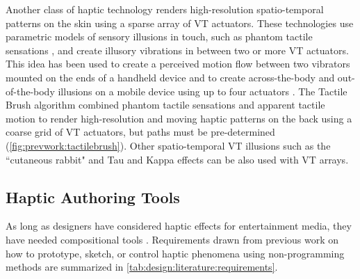 Another class of haptic technology renders high-resolution spatio-temporal patterns on the skin using a sparse array of VT actuators.
These technologies use parametric models of sensory illusions in touch, such as phantom tactile sensations \cite{Alles1970}, and create illusory vibrations in between two or more VT actuators.
%
This idea has been used to %
create a perceived motion flow between two vibrators mounted on the ends of a handheld device %
\cite{Seo2013} and to
create across-the-body and out-of-the-body illusions on a mobile device using up to four %
actuators \cite{Lee2012a}.
The Tactile Brush algorithm \cite{Israr2011a} combined phantom tactile sensations and apparent tactile motion to render high-resolution and moving haptic patterns on the back using a coarse grid of VT actuators, but paths must be pre-determined (\autoref{fig:prevwork:tactilebrush}). 
Other spatio-temporal VT illusions such as the  ``cutaneous rabbit"  \cite{Tan2009} and Tau and Kappa effects \cite{Hayward2008} can be also used with VT arrays.



%
%
\subsection{Haptic Authoring Tools}
As long as designers have considered haptic effects for entertainment media, they have needed compositional tools %
\cite{Gunther2002}.
Requirements drawn from previous work on how to prototype, sketch, or control haptic phenomena using non-programming methods are summarized in
\autoref{tab:design:literature:requirements}.

